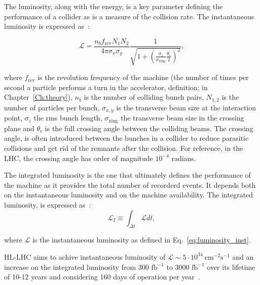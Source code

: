 The luminosity, along with the energy, is a key parameter defining the performance of a collider as is a measure of the collision rate. The instantaneous luminosity is expressed as~\cite{luminosity}:

\begin{equation}\label{eq:luminosity_inst}
    \mathcal{L} = \frac{n_b f_\mathrm{rev}N_1 N_2}{4 \pi \sigma_x \sigma_y} \frac{1}{\sqrt{1+(\frac{\sigma_z}{\sigma_\mathrm{xing}} \frac{\theta_c}{2})^2}},
\end{equation}

where $f_{\mathrm{rev}}$ is the revolution frequency of the machine (the number of times per second a particle performs a turn in the accelerator, definition; in Chapter~\ref{Ch:theory}), $n_b$ is the number of colliding bunch pairs, $N_{1,2}$ is the number of particles per bunch, $\sigma_{x,y}$ is the transverse beam size at the interaction point, $\sigma_z$ the rms bunch length, $\sigma_{\mathrm{xing}}$ the transverse beam size in the crossing plane and $\theta_c$ is the full crossing angle between the colliding beams. %
 The crossing angle, is often introduced between the bunches in a collider to reduce parasitic collisions and get rid of the remnants after the collision. For reference, in the LHC, the crossing angle has order of magnitude $10^{-4}$ radians. %

The integrated luminosity is the one that ultimately defines the performance of the machine as it provides the total number of recorderd events. It depends both on the instantaneous luminosity and on the machine availability. The integrated luminosity, is expressed as~\cite{HL_LHC_yellow_report}:
\begin{equation}\label{eq:integrated_luminosity}
    \mathcal{L}_I \equiv \int_{\Delta t} \mathcal{L} dt,
\end{equation}

where $\mathcal{L}$ is the instantaneous luminosity as defined in Eq.~\eqref{eq:luminosity_inst}.

HL-LHC aims to achive instantaneous luminosity of $\mathcal{L} \sim 5 \cdot 10^{34} \ \mathrm{cm^{-2} s^{-1}}$ and an increase on the integrated luminosity from 300 $\mathrm{fb^{-1}}$ to 3000 $\mathrm{fb^{-1}}$ over its lifetime of 10-12 years and considering 160 days of operation per year~\cite{Brunning_Rossi}. %

